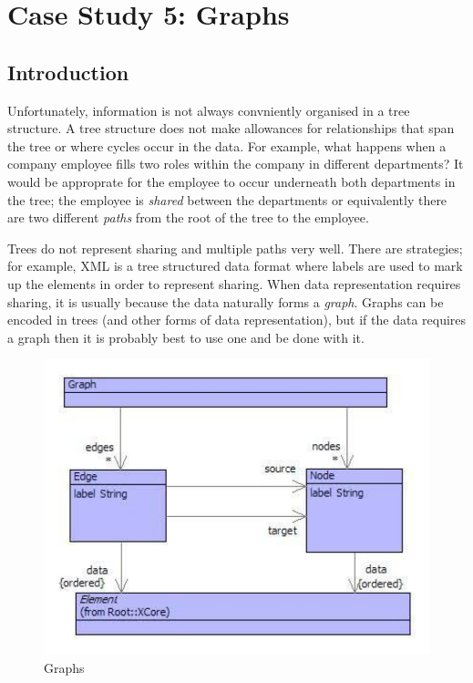\chapter{Case Study 5: Graphs}

\section{Introduction}

Unfortunately, information is not always convniently organised in
a tree structure. A tree structure does not make allowances for relationships
that span the tree or where cycles occur in the data. For example,
what happens when a company employee fills two roles within the company
in different departments? It would be approprate for the employee
to occur underneath both departments in the tree; the employee is
\textit{shared} between the departments or equivalently there are
two different \textit{paths} from the root of the tree to the employee.

Trees do not represent sharing and multiple paths very well. There
are strategies; for example, XML is a tree structured data format
where labels are used to mark up the elements in order to represent
sharing. When data representation requires sharing, it is usually
because the data naturally forms a \textit{graph}. Graphs can be encoded
in trees (and other forms of data representation), but if the data
requires a graph then it is probably best to use one and be done with
it.

%
\begin{figure}
\begin{center}
\includegraphics[scale=0.75]{CaseStudy5/figures/Graphs.pdf}

\caption{Graphs\label{fig:Graphs}}
\end{center}
\end{figure}


